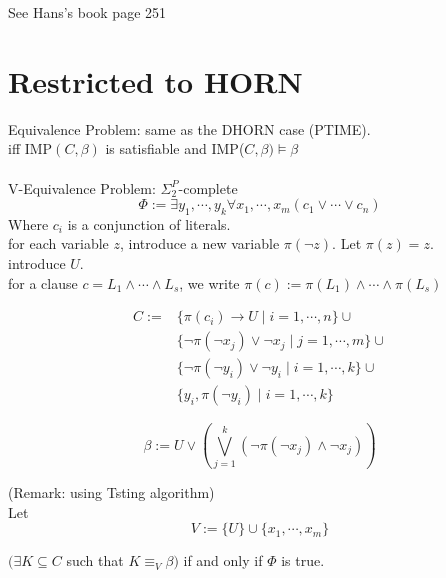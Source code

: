 \documentclass[12pt]{article}
\begin{document}
{See Hans's book page 251


\section{Restricted to HORN}


Equivalence Problem: same as the DHORN case (PTIME).\\

iff IMP$(C,\beta)$ is satisfiable and IMP($C,\beta)\models \beta$\\ 

\ \\

V-Equivalence Problem:  $\Sigma_2^P$-complete\\ 


$$\Phi:=\exists y_1,\cdots, y_k \forall x_1,\cdots, x_m \left(c_1\vee\cdots\vee c_n \right)$$
%
Where $c_i$ is a conjunction of literals.\\

for each variable $z$, introduce a new variable $\pi(\neg z)$. Let $\pi(z)=z$.\\

introduce $U$.\\

for a clause $c=L_1\wedge\cdots\wedge L_s$, we write 
$\pi(c):=\pi(L_1)\wedge\cdots\wedge \pi(L_s)$





$$\begin{array}{ll}C:=&\{\pi(c_i)\rightarrow U\mid i=1,\cdots,n\}\cup\\ 
&\{\neg \pi(\neg x_j)\vee \neg x_j\mid j=1,\cdots,m\}\cup\\

&\{\neg \pi(\neg y_i)\vee \neg y_i\mid i=1,\cdots, k\}\cup\\
&\{y_i,\pi(\neg y_i)\mid i=1,\cdots,k\}\end{array}$$


$$\beta:= U\vee \left(\bigvee_{j=1}^k (\neg \pi(\neg x_j)\wedge \neg x_j)\right)$$


(Remark: using Tsting algorithm) \\

Let $$V:=\{U\}\cup\{x_1,\cdots,x_m\}$$

$(\exists K\subseteq C$ such that $K\equiv_V \beta)$ if and only if $\Phi$ is true.

\ \\

\ \\

}
\end{document}
